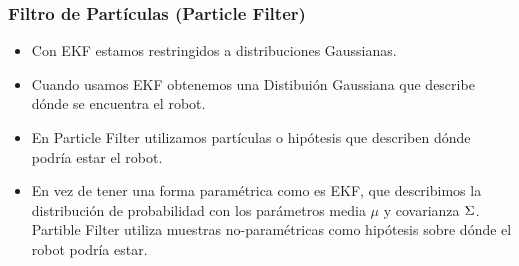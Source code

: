 \begin{frame}
    \frametitle{Filtro de Partículas (Particle Filter)}
    \footnotesize
    \begin{itemize}
        \item Con EKF estamos restringidos a distribuciones Gaussianas.
        \item Cuando usamos EKF obtenemos una Distibuión Gaussiana que describe dónde se encuentra el robot.
        \item En Particle Filter utilizamos partículas o hipótesis que describen dónde podría estar el robot.
        \item En vez de tener una forma paramétrica como es EKF, que describimos la distribución de probabilidad con los parámetros media $\mu$ y covarianza $\Sigma$. Partible Filter utiliza muestras no-paramétricas como hipótesis sobre dónde el robot podría estar.
    \end{itemize}
    
    
   	\begin{center}
    \end{center}
    
    
\end{frame}


